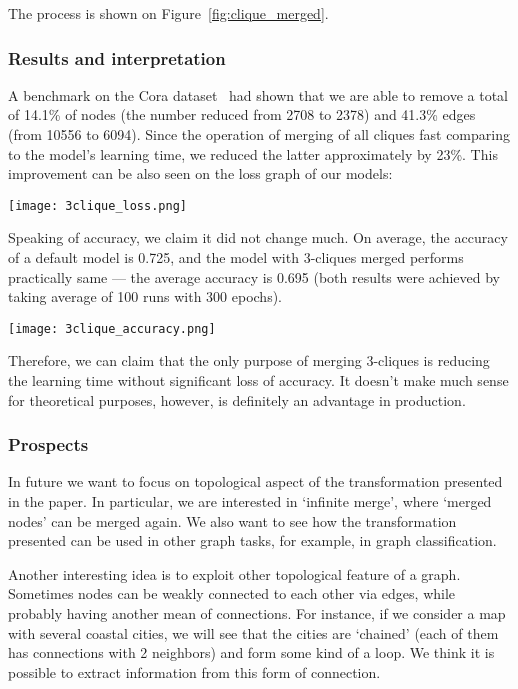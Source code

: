 The process is shown on Figure~\ref{fig:clique_merged}.

\subsubsection*{Results and interpretation}

A benchmark on the Cora dataset~\cite{cora_dataset} had shown that we are able to remove a total of 14.1\% of nodes (the number reduced from 2708 to 2378) and 41.3\% edges (from 10556 to 6094).
Since the operation of merging of all cliques fast comparing to the model's learning time, we reduced the latter approximately by 23\%.
This improvement can be also seen on the loss graph of our models:

\texttt{[image: 3clique\_loss.png]}

Speaking of accuracy, we claim it did not change much.
On average, the accuracy of a default model is 0.725, and the model with 3-cliques merged performs practically same --- the average accuracy is 0.695 (both results were achieved by taking average of 100 runs with 300 epochs).

\texttt{[image: 3clique\_accuracy.png]}

Therefore, we can claim that the only purpose of merging 3-cliques is reducing the learning time without significant loss of accuracy.
It doesn't make much sense for theoretical purposes, however, is definitely an advantage in production.

\subsubsection*{Prospects}

In future we want to focus on topological aspect of the transformation presented in the paper.
In particular, we are interested in `infinite merge', where `merged nodes' can be merged again.
We also want to see how the transformation presented can be used in other graph tasks, for example, in graph classification.

Another interesting idea is to exploit other topological feature of a graph.
Sometimes nodes can be weakly connected to each other via edges, while probably having another mean of connections.
For instance, if we consider a map with several coastal cities, we will see that the cities are `chained' (each of them has connections with 2 neighbors) and form some kind of a loop.
We think it is possible to extract information from this form of connection.


